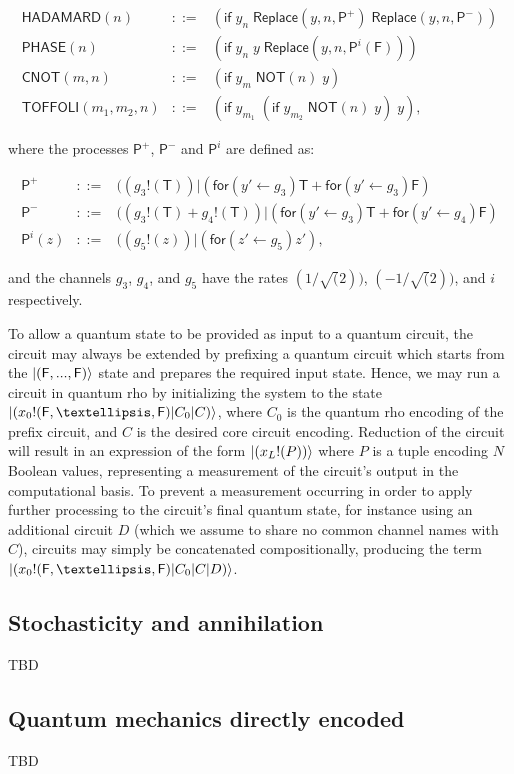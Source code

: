 \begin{eqnarray}
\mathsf{HADAMARD}(n) &::=& (\mathsf{if} \; y_n \; \mathsf{Replace}(y,n,\mathsf{P}^+) \; \mathsf{Replace}(y,n,\mathsf{P}^-)) \nonumber \\
\mathsf{PHASE}(n) &::=& (\mathsf{if} \; y_n \; y \; \mathsf{Replace}(y,n,\mathsf{P}^i(\mathsf{F}))) \nonumber \\
\mathsf{CNOT}(m,n) &::=& (\mathsf{if} \; y_m \; \mathsf{NOT}(n) \; y) \nonumber \\
\mathsf{TOFFOLI}(m_1,m_2,n) &::=& (\mathsf{if} \; y_{m_1} \; (\mathsf{if} \; y_{m_2} \; \mathsf{NOT}(n) \; y) \; y),
\end{eqnarray}

\noindent where the processes $\mathsf{P}^+$, $\mathsf{P}^-$ and $\mathsf{P}^i$ are defined as:

\begin{eqnarray}
\mathsf{P}^+ &::=& ((g_3 \mathsf{!} (\mathsf{T})) \mathsf{|} (\mathsf{for}(y'\leftarrow g_3)\mathsf{T} + \mathsf{for}(y'\leftarrow g_3)\mathsf{F}) \nonumber \\
\mathsf{P}^- &::=& ((g_3 \mathsf{!} (\mathsf{T}) + g_4 \mathsf{!} (\mathsf{T})) \mathsf{|} (\mathsf{for}(y'\leftarrow g_3)\mathsf{T} + \mathsf{for}(y'\leftarrow g_4)\mathsf{F}) \nonumber \\
\mathsf{P}^i(z) &::=& ((g_5 \mathsf{!} (z)) \mathsf{|} (\mathsf{for}(z'\leftarrow g_5)z'),
\end{eqnarray}

\noindent and the channels $g_3$, $g_4$, and $g_5$ have the rates $(1/\sqrt(2))$, $(-1/\sqrt(2))$, and $i$ respectively. 

To allow a quantum state to be provided as input to a quantum circuit, the circuit may always be extended by prefixing a quantum circuit which starts from the $\ket{(\mathsf{F},...,\mathsf{F})}$  state and prepares the required input state.  Hence, we may run a circuit in quantum rho by initializing the system to the state $\ket{(x_0 \mathsf{!}(\mathsf{F},…,\mathsf{F})\mathsf{|}C_0 \mathsf{|}C)}$, where  $C_0$ is the quantum rho encoding of the prefix circuit, and $C$ is the desired core circuit encoding.  Reduction of the circuit will result in an expression of the form $\ket{(x_L \mathsf{!}(P))}$ where $P$ is a tuple encoding $N$ Boolean values, representing a measurement of the circuit’s output in the computational basis.  To prevent a measurement occurring in order to apply further processing to the circuit’s final quantum state, for instance using an additional circuit $D$ (which we assume to share no common channel names with $C$), circuits may simply be concatenated compositionally, producing the term $\ket{(x_0 \mathsf{!}(\mathsf{F},…,\mathsf{F})|C_0 |C|D)}$.

\subsection{Stochasticity and annihilation}

TBD

\subsection{Quantum mechanics directly encoded}

TBD

